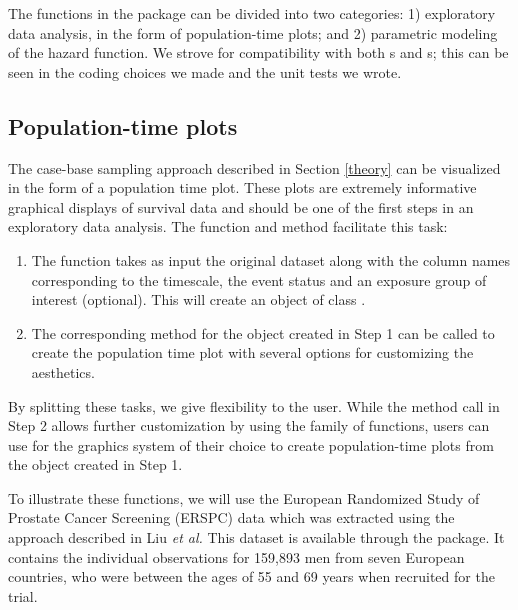 \documentclass[
]{jss}
\providecommand{\tightlist}{%
  \setlength{\itemsep}{0pt}\setlength{\parskip}{0pt}}
\begin{document}
The functions in the  package can be divided into two
categories: 1) exploratory data analysis, in the form of population-time
plots; and 2) parametric modeling of the hazard function. We strove for
compatibility with both s and s; this
can be seen in the coding choices we made and the unit tests we wrote.

\hypertarget{population-time-plots}{%
\subsection{Population-time plots}\label{population-time-plots}}

The case-base sampling approach described in Section \ref{theory} can be
visualized in the form of a population time plot. These plots are
extremely informative graphical displays of survival data and should be
one of the first steps in an exploratory data analysis. The
 function and  method facilitate this task:

\begin{enumerate}
\def\labelenumi{\arabic{enumi}.}
\tightlist
\item
  The  function takes as input the original
  dataset along with the column names corresponding to the timescale,
  the event status and an exposure group of interest (optional). This
  will create an object of class .\\
\item
  The corresponding  method for the object created in Step 1
  can be called to create the population time plot with several options
  for customizing the aesthetics.
\end{enumerate}

By splitting these tasks, we give flexibility to the user. While the
method call in Step 2 allows further customization by using the
 \citep{ggplot2} family of functions, users can use for the
graphics system of their choice to create population-time plots from the
object created in Step 1.

To illustrate these functions, we will use the European Randomized Study
of Prostate Cancer Screening (ERSPC) data \citep{schroder2009screening}
which was extracted using the approach described in Liu \emph{et al.}
\citeyearpar{liu2014recovering} This dataset is available through the
 package. It contains the individual observations for
159,893 men from seven European countries, who were between the ages of
55 and 69 years when recruited for the trial.
\end{document}
